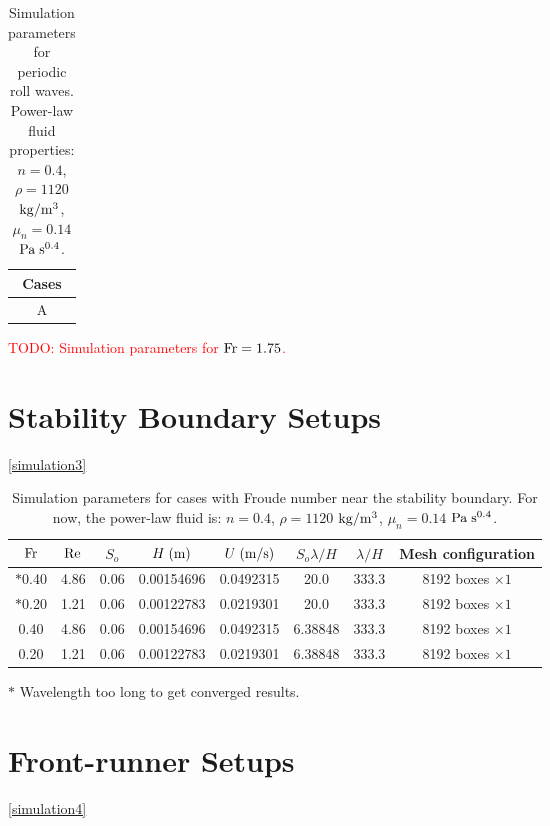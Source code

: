 \documentclass[a4paper]{article}
\newcommand{\fr}{{\rm{Fr}}}
\begin{document}
\begin{table}[htbp]
	\begin{subtable}{1\textwidth}
		\centering
		\begin{tabular}{c}
			Cases\\
			\toprule
				A \\
			\bottomrule 
		\end{tabular}
		\caption{\textcolor{red}{TODO: Simulation parameters for $\fr=1.75$.}}
		\label{params_175}
	\end{subtable}

	\caption{Simulation parameters for periodic roll waves. Power-law fluid properties: $n=0.4$, $\rho=1120$ $\rm{kg/m^3}$, $\mu_n=0.14$ $\rm Pa\;s^{0.4}$.}
	\label{simulation2}
\end{table}

\section{Stability Boundary Setups}
\autoref{simulation3}
\begin{table}[htbp]
	\centering
	\begin{tabular}{cccccccc}
		$\fr$ & $\rm Re$ & $S_o$ & $H\;{\rm (m)}$ & $U\;{\rm (m/s)}$ & $S_o\lambda/H$ & $\lambda/H$ & Mesh configuration\\
		\toprule
		$*$0.40 & 4.86 & 0.06 & 0.00154696 & 0.0492315 & 20.0 & 333.3 & 8192 boxes $\times 1$\\
		$*$0.20 & 1.21 & 0.06 & 0.00122783 & 0.0219301 & 20.0 & 333.3 & 8192 boxes $\times 1$\\
		
		0.40 & 4.86 & 0.06 & 0.00154696 & 0.0492315 & 6.38848 & 333.3 & 8192 boxes $\times 1$\\
		0.20 & 1.21 & 0.06 & 0.00122783 & 0.0219301 & 6.38848 & 333.3 & 8192 boxes $\times 1$\\
		
		\bottomrule 
	\end{tabular}
	\begin{tablenotes}
		\small
		\item $*$ Wavelength too long to get converged results.
	\end{tablenotes}
	\caption{Simulation parameters for cases with Froude number near the stability boundary. For now, the power-law fluid is: $n=0.4$, $\rho=1120$ $\rm{kg/m^3}$, $\mu_n=0.14$ $\rm Pa\;s^{0.4}$.}
	\label{simulation3}
\end{table}

\section{Front-runner Setups}
\autoref{simulation4}
\end{document}

